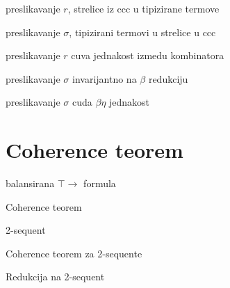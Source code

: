 \begin{lema}
  preslikavanje $r$, strelice iz ccc u tipizirane termove
\end{lema}

\begin{lema}
  preslikavanje $\sigma$, tipizirani termovi u strelice u ccc
\end{lema}

\begin{lema}
  preslikavanje $r$ cuva jednakost izmedu kombinatora
\end{lema}

\begin{lema}
  preslikavanje $\sigma$ invarijantno na $\beta$ redukciju
\end{lema}

\begin{lema}
  preslikavanje $\sigma$ cuda $\beta\eta$ jednakost
\end{lema}


\section{Coherence teorem}
\begin{definition}
  balansirana $\top \to$ formula
\end{definition}

\begin{teorem}
  Coherence teorem
\end{teorem}

\begin{definition}
  2-sequent
\end{definition}

\begin{teorem}
  Coherence teorem za 2-sequente
\end{teorem}

\begin{teorem}
  Redukcija na 2-sequent
\end{teorem}
